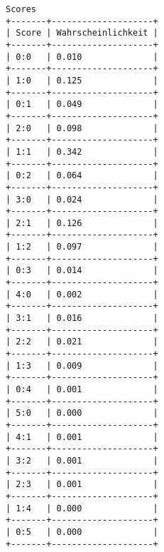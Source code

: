 \documentclass[a4paper]{article}
\begin{document}
\begin{lstlisting}
Scores
+-------+--------------------+
| Score | Wahrscheinlichkeit |
+-------+--------------------+
| 0:0   | 0.010              |
+-------+--------------------+
| 1:0   | 0.125              |
+-------+--------------------+
| 0:1   | 0.049              |
+-------+--------------------+
| 2:0   | 0.098              |
+-------+--------------------+
| 1:1   | 0.342              |
+-------+--------------------+
| 0:2   | 0.064              |
+-------+--------------------+
| 3:0   | 0.024              |
+-------+--------------------+
| 2:1   | 0.126              |
+-------+--------------------+
| 1:2   | 0.097              |
+-------+--------------------+
| 0:3   | 0.014              |
+-------+--------------------+
| 4:0   | 0.002              |
+-------+--------------------+
| 3:1   | 0.016              |
+-------+--------------------+
| 2:2   | 0.021              |
+-------+--------------------+
| 1:3   | 0.009              |
+-------+--------------------+
| 0:4   | 0.001              |
+-------+--------------------+
| 5:0   | 0.000              |
+-------+--------------------+
| 4:1   | 0.001              |
+-------+--------------------+
| 3:2   | 0.001              |
+-------+--------------------+
| 2:3   | 0.001              |
+-------+--------------------+
| 1:4   | 0.000              |
+-------+--------------------+
| 0:5   | 0.000              |
+-------+--------------------+

\end{lstlisting}
\end{document}
